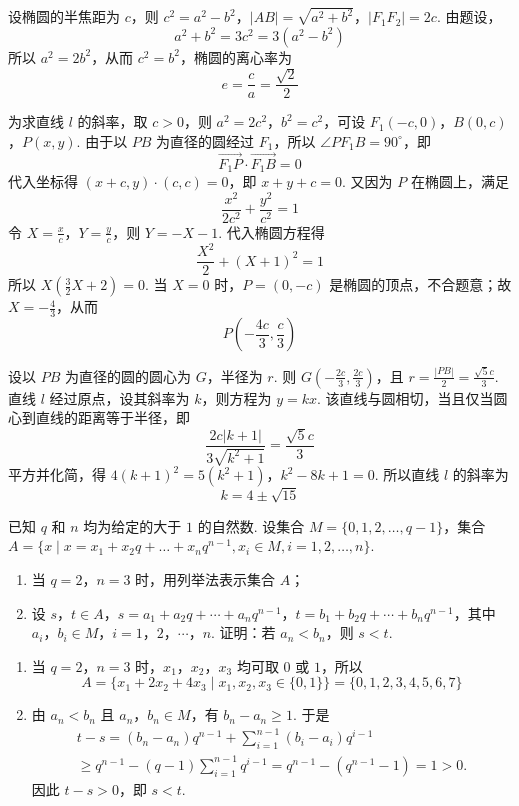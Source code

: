 \begin{solution}
设椭圆的半焦距为 \(c\)，则 \(c^2=a^2-b^2\)，\(|AB|=\sqrt{a^2+b^2}\)，\(|F_1F_2|=2c\). 由题设，
\[
a^2+b^2=3c^2=3(a^2-b^2)
\]
所以 \(a^2=2b^2\)，从而 \(c^2=b^2\)，椭圆的离心率为
\[
e=\frac ca=\frac{\sqrt2}{2}
\]

为求直线 \(l\) 的斜率，取 \(c>0\)，则 \(a^2=2c^2\)，\(b^2=c^2\)，可设 \(F_1(-c,0)\)，\(B(0,c)\)，\(P(x,y)\). 由于以 \(PB\) 为直径的圆经过 \(F_1\)，所以 \(\angle PF_1B=90^\circ\)，即
\[
\overrightarrow{F_1P}\cdot\overrightarrow{F_1B}=0
\]
代入坐标得 \((x+c,y)\cdot(c,c)=0\)，即 \(x+y+c=0\). 又因为 \(P\) 在椭圆上，满足
\[
\frac{x^2}{2c^2}+\frac{y^2}{c^2}=1
\]
令 \(X=\frac{x}{c}\)，\(Y=\frac{y}{c}\)，则 \(Y=-X-1\). 代入椭圆方程得
\[
\frac{X^2}{2}+(X+1)^2=1
\]
所以 \(X\left(\frac32X+2\right)=0\). 当 \(X=0\) 时，\(P=(0,-c)\) 是椭圆的顶点，不合题意；故 \(X=-\frac43\)，从而
\[
P\left(-\frac{4c}{3},\frac c3\right)
\]

设以 \(PB\) 为直径的圆的圆心为 \(G\)，半径为 \(r\). 则 \(G\left(-\frac{2c}{3},\frac{2c}{3}\right)\)，且 \(r=\frac{|PB|}{2}=\frac{\sqrt5c}{3}\). 直线 \(l\) 经过原点，设其斜率为 \(k\)，则方程为 \(y=kx\). 该直线与圆相切，当且仅当圆心到直线的距离等于半径，即
\[
\frac{2c|k+1|}{3\sqrt{k^2+1}}=\frac{\sqrt5c}{3}
\]
平方并化简，得
\(4(k+1)^2=5(k^2+1)\)，\(k^2-8k+1=0\).
所以直线 \(l\) 的斜率为
\[
k=4\pm\sqrt{15}
\]
\end{solution}

\begin{problem}
已知 \(q\) 和 \(n\) 均为给定的大于 \(1\) 的自然数. 设集合 \(M = \{0, 1, 2, \dots, q - 1\}\)，集合 \(A = \{x \mid x = x_1 + x_2q + \dots + x_nq^{n-1}, x_i \in M, i = 1, 2, \dots, n\}\).

\begin{enumerate}
\item 当 \(q = 2\)，\(n = 3\) 时，用列举法表示集合 \(A\)；
\item 设 \(s\)，\(t \in A\)，\(s = a_1 + a_2q + \cdots + a_nq^{n-1}\)，\(t = b_1 + b_2q + \cdots + b_nq^{n-1}\)，其中 \(a_i\)，\(b_i \in M\)，\(i = 1\)，\(2\)，\(\cdots\)，\(n\). 证明：若 \(a_n < b_n\)，则 \(s < t\).
\end{enumerate}
\end{problem}

\begin{solution}
\begin{enumerate}
\item 当 \(q=2\)，\(n=3\) 时，\(x_1\)，\(x_2\)，\(x_3\) 均可取 \(0\) 或 \(1\)，所以
\[
A=\{x_1+2x_2+4x_3\mid x_1,x_2,x_3\in\{0,1\}\}=\{0,1,2,3,4,5,6,7\}
\]

\item 由 \(a_n<b_n\) 且 \(a_n\)，\(b_n\in M\)，有 \(b_n-a_n\geqslant1\). 于是
\[
\begin{gathered}
t-s=(b_n-a_n)q^{n-1}+\sum_{i=1}^{n-1}(b_i-a_i)q^{i-1}\\
\geqslant q^{n-1}-(q-1)\sum_{i=1}^{n-1}q^{i-1}=q^{n-1}-(q^{n-1}-1)=1>0.
\end{gathered}
\]
因此 \(t-s>0\)，即 \(s<t\).
\end{enumerate}
\end{solution}

